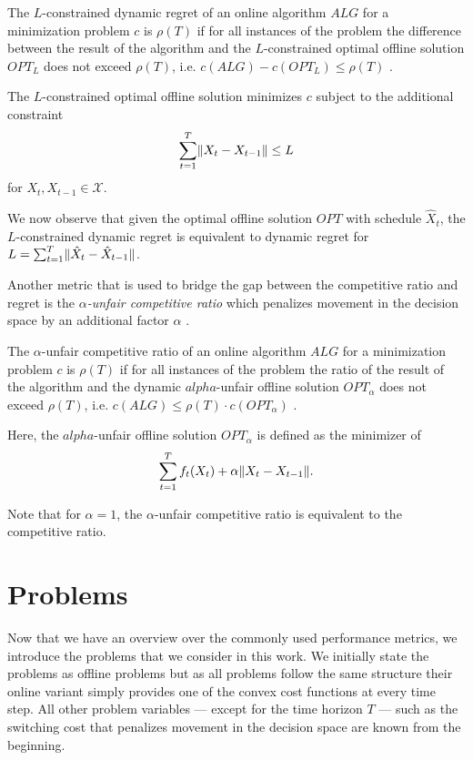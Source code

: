 \begin{definition}
The $L$-constrained dynamic regret of an online algorithm $ALG$ for a minimization problem $c$ is $\rho(T)$ if for all instances of the problem the difference between the result of the algorithm and the $L$-constrained optimal offline solution $OPT_L$ does not exceed $\rho(T)$, i.e. $c(ALG) - c(OPT_L) \leq \rho(T)$ \cite{Chen2018}.

The $L$-constrained optimal offline solution minimizes $c$ subject to the additional constraint \begin{align*}
    \sum_{t=1}^T \lVert X_t - X_{t-1}\rVert \leq L
\end{align*} for $X_t, X_{t-1} \in \mathcal{X}$.
\end{definition}

We now observe that given the optimal offline solution $OPT$ with schedule $\hat{X}_t$, the $L$-constrained dynamic regret is equivalent to dynamic regret for $L = \sum_{t=1}^T \lVert\hat{X}_t - \hat{X}_{t-1}\rVert$.

Another metric that is used to bridge the gap between the competitive ratio and regret is the \emph{$\alpha$-unfair competitive ratio} which penalizes movement in the decision space by an additional factor $\alpha$ \cite{Andrew2015}.

\begin{definition}
The $\alpha$-unfair competitive ratio of an online algorithm $ALG$ for a minimization problem $c$ is $\rho(T)$ if for all instances of the problem the ratio of the result of the algorithm and the dynamic $alpha$-unfair offline solution $OPT_{\alpha}$ does not exceed $\rho(T)$, i.e. $c(ALG) \leq \rho(T) \cdot c(OPT_{\alpha})$ \cite{Andrew2015}.

Here, the $alpha$-unfair offline solution $OPT_{\alpha}$ is defined as the minimizer of \begin{align*}
    \sum_{t=1}^T f_t(X_t) + \alpha \lVert X_t - X_{t-1}\rVert.
\end{align*}
\end{definition}

Note that for $\alpha = 1$, the $\alpha$-unfair competitive ratio is equivalent to the competitive ratio.

\section{Problems}

Now that we have an overview over the commonly used performance metrics, we introduce the problems that we consider in this work. We initially state the problems as offline problems but as all problems follow the same structure their online variant simply provides one of the convex cost functions at every time step. All other problem variables --- except for the time horizon $T$ --- such as the switching cost that penalizes movement in the decision space are known from the beginning.

